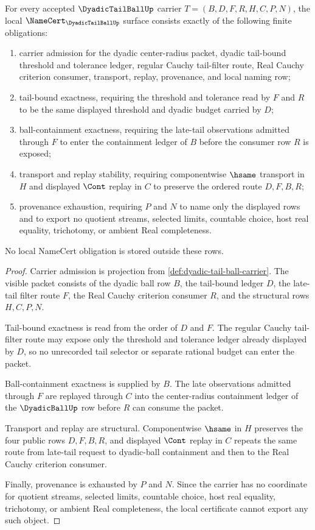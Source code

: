 \begin{theorem}
\label{thm:dyadic-tail-ball-namecert-obligations}
For every accepted $\DyadicTailBallUp$ carrier $T=(B,D,F,R,H,C,P,N)$, the local $\NameCert_{\DyadicTailBallUp}$ surface consists exactly of the following finite obligations:
\begin{enumerate}
\item carrier admission for the dyadic center-radius packet, dyadic tail-bound threshold and tolerance ledger, regular Cauchy tail-filter route, Real Cauchy criterion consumer, transport, replay, provenance, and local naming row;
\item tail-bound exactness, requiring the threshold and tolerance read by $F$ and $R$ to be the same displayed threshold and dyadic budget carried by $D$;
\item ball-containment exactness, requiring the late-tail observations admitted through $F$ to enter the containment ledger of $B$ before the consumer row $R$ is exposed;
\item transport and replay stability, requiring componentwise $\hsame$ transport in $H$ and displayed $\Cont$ replay in $C$ to preserve the ordered route $D,F,B,R$;
\item provenance exhaustion, requiring $P$ and $N$ to name only the displayed rows and to export no quotient streams, selected limits, countable choice, host real equality, trichotomy, or ambient Real completeness.
\end{enumerate}
No local NameCert obligation is stored outside these rows.
\end{theorem}
\begin{proof}
Carrier admission is projection from \autoref{def:dyadic-tail-ball-carrier}. The visible packet consists of the dyadic ball row $B$, the tail-bound ledger $D$, the late-tail filter route $F$, the Real Cauchy criterion consumer $R$, and the structural rows $H,C,P,N$.

Tail-bound exactness is read from the order of $D$ and $F$. The regular Cauchy tail-filter route may expose only the threshold and tolerance ledger already displayed by $D$, so no unrecorded tail selector or separate rational budget can enter the packet.

Ball-containment exactness is supplied by $B$. The late observations admitted through $F$ are replayed through $C$ into the center-radius containment ledger of the $\DyadicBallUp$ row before $R$ can consume the packet.

Transport and replay are structural. Componentwise $\hsame$ in $H$ preserves the four public rows $D,F,B,R$, and displayed $\Cont$ replay in $C$ repeats the same route from late-tail request to dyadic-ball containment and then to the Real Cauchy criterion consumer.

Finally, provenance is exhausted by $P$ and $N$. Since the carrier has no coordinate for quotient streams, selected limits, countable choice, host real equality, trichotomy, or ambient Real completeness, the local certificate cannot export any such object.
\end{proof}

